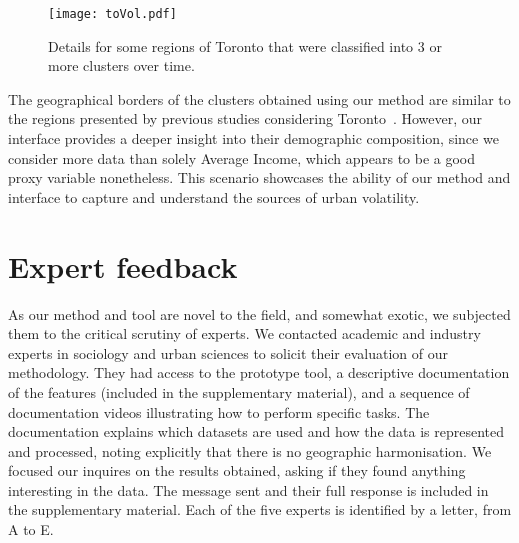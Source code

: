 \begin{figure}
    \centering 
    \texttt{[image: toVol.pdf]}
    \caption{Details for some regions of Toronto that were classified into 3 or
         more clusters over time.\label{fig:toVol}}
\end{figure}



The geographical borders of the clusters obtained using our method are similar
to the regions presented by previous studies considering
Toronto~\citep{hulchanski2007three}. However, our interface provides a deeper
insight into their demographic composition, since we consider more data than
solely Average Income, which appears to be a good proxy variable nonetheless.
This scenario showcases the ability of our method and interface to capture and
understand the sources of urban volatility.

\section{Expert feedback}
\label{sec:expert}
As our method and tool are novel to the field, and somewhat exotic,  we
subjected them to the critical scrutiny of experts. We contacted academic and
industry experts in sociology and urban sciences to solicit their evaluation of
our methodology. They had access to the prototype tool, a descriptive
documentation of the features (included in the supplementary material), and a
sequence of documentation videos illustrating how to perform specific tasks. The
documentation explains which datasets are used and how the data is represented
and processed, noting explicitly that there is no geographic harmonisation. We
focused our inquires on the results obtained, asking if they found anything
interesting in the data. The message sent and their full response is included in
the supplementary material. Each of the five experts is identified by a letter,
from A to E. 



